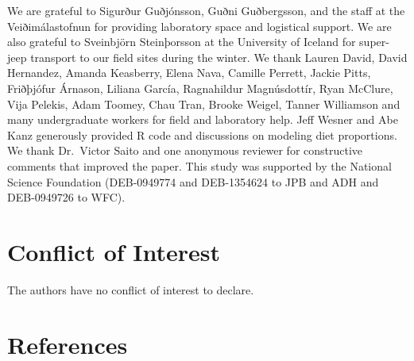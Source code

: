 \documentclass[
]{article}
\numberwithin{equation}
\begin{document}
We are grateful to Sigurður Guðjónsson, Guðni Guðbergsson, and the staff
at the Veiðimálastofnun for providing laboratory space and logistical
support. We are also grateful to Sveinbjörn Steinþorsson at the
University of Iceland for super-jeep transport to our field sites during
the winter. We thank Lauren David, David Hernandez, Amanda Keasberry,
Elena Nava, Camille Perrett, Jackie Pitts, Friðþjófur Árnason, Liliana
García, Ragnahildur Magnúsdottír, Ryan McClure, Vija Pelekis, Adam
Toomey, Chau Tran, Brooke Weigel, Tanner Williamson and many
undergraduate workers for field and laboratory help. Jeff Wesner and Abe
Kanz generously provided R code and discussions on modeling diet
proportions. We thank Dr.~Victor Saito and one anonymous reviewer for
constructive comments that improved the paper. This study was supported
by the National Science Foundation (DEB-0949774 and DEB-1354624 to JPB
and ADH and DEB-0949726 to WFC).

\hypertarget{conflict-of-interest}{%
\section{Conflict of Interest}\label{conflict-of-interest}}

The authors have no conflict of interest to declare.

\hypertarget{references}{%
\section{References}\label{references}}
\end{document}
